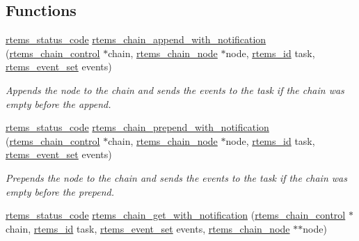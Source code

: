 \subsection*{Functions}
\begin{DoxyCompactItemize}
\item 
\mbox{\hyperlink{group__ClassicStatus_ga545d41846817eaba6143d52ee4d9e9fe}{rtems\+\_\+status\+\_\+code}} \mbox{\hyperlink{group__ClassicChains_gaa7f797fb91aa37852b3e02dd97ff4e24}{rtems\+\_\+chain\+\_\+append\+\_\+with\+\_\+notification}} (\mbox{\hyperlink{unionChain__Control}{rtems\+\_\+chain\+\_\+control}} $\ast$chain, \mbox{\hyperlink{structChain__Node__struct}{rtems\+\_\+chain\+\_\+node}} $\ast$node, \mbox{\hyperlink{group__ClassicTasks_gab20892b814dced7dd4e5b9bf42becd57}{rtems\+\_\+id}} task, \mbox{\hyperlink{group__ClassicEventSet_gab7b8f373bea85fd4e3b7ae23905faa07}{rtems\+\_\+event\+\_\+set}} events)
\begin{DoxyCompactList}\small\item\em Appends the {\itshape node} to the {\itshape chain} and sends the {\itshape events} to the {\itshape task} if the {\itshape chain} was empty before the append. \end{DoxyCompactList}\item 
\mbox{\hyperlink{group__ClassicStatus_ga545d41846817eaba6143d52ee4d9e9fe}{rtems\+\_\+status\+\_\+code}} \mbox{\hyperlink{group__ClassicChains_ga3efb7679b69706b9fc53a1d5547dd5f4}{rtems\+\_\+chain\+\_\+prepend\+\_\+with\+\_\+notification}} (\mbox{\hyperlink{unionChain__Control}{rtems\+\_\+chain\+\_\+control}} $\ast$chain, \mbox{\hyperlink{structChain__Node__struct}{rtems\+\_\+chain\+\_\+node}} $\ast$node, \mbox{\hyperlink{group__ClassicTasks_gab20892b814dced7dd4e5b9bf42becd57}{rtems\+\_\+id}} task, \mbox{\hyperlink{group__ClassicEventSet_gab7b8f373bea85fd4e3b7ae23905faa07}{rtems\+\_\+event\+\_\+set}} events)
\begin{DoxyCompactList}\small\item\em Prepends the {\itshape node} to the {\itshape chain} and sends the {\itshape events} to the {\itshape task} if the {\itshape chain} was empty before the prepend. \end{DoxyCompactList}\item 
\mbox{\hyperlink{group__ClassicStatus_ga545d41846817eaba6143d52ee4d9e9fe}{rtems\+\_\+status\+\_\+code}} \mbox{\hyperlink{group__ClassicChains_gae041dcf53508f057ea88b8f106cac330}{rtems\+\_\+chain\+\_\+get\+\_\+with\+\_\+notification}} (\mbox{\hyperlink{unionChain__Control}{rtems\+\_\+chain\+\_\+control}} $\ast$chain, \mbox{\hyperlink{group__ClassicTasks_gab20892b814dced7dd4e5b9bf42becd57}{rtems\+\_\+id}} task, \mbox{\hyperlink{group__ClassicEventSet_gab7b8f373bea85fd4e3b7ae23905faa07}{rtems\+\_\+event\+\_\+set}} events, \mbox{\hyperlink{structChain__Node__struct}{rtems\+\_\+chain\+\_\+node}} $\ast$$\ast$node)
$$
\end{DoxyCompactItemize}
